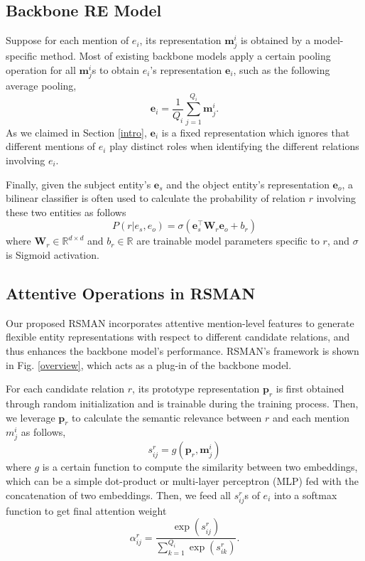 \documentclass[11pt]{article}
\begin{document}
\subsection{Backbone RE Model}




Suppose for each mention of $e_i$, its representation $\boldsymbol{m}^i_j$ is obtained by a model-specific method. Most of existing backbone models apply a certain pooling operation for all $\boldsymbol{m}^i_j$s to obtain $e_i$'s representation $\boldsymbol{e}_i$, such as the following average pooling,
\begin{equation}\label{en_co}
\boldsymbol{e}_i=\frac{1}{Q_i}\sum_{j=1}^{Q_i}\boldsymbol{m}_j^i.
\end{equation}
As we claimed in Section \ref{intro}, $\boldsymbol{e}_i$ is a fixed representation which ignores that different mentions of $e_i$ play distinct roles when identifying the different relations involving $e_i$. 

Finally, given the subject entity's $\boldsymbol{e}_{s}$ and the object entity's representation $\boldsymbol{e}_{o}$, a bilinear classifier is often used to calculate the probability of relation $r$ involving these two entities as follows
\begin{equation}\label{bilinear}
P(r|{e}_{s},{e}_{o}) = \sigma(\boldsymbol{e}_{s}^\top \boldsymbol{W}_r \boldsymbol{e}_{o}+b_r)
\end{equation}
where $\boldsymbol{W}_r \in \mathbb{R}^{d \times d}$ and $b_r \in \mathbb{R}$ are trainable model parameters specific to $r$, and $\sigma$ is Sigmoid activation. 


\subsection{Attentive Operations in RSMAN}
Our proposed RSMAN incorporates attentive mention-level features to generate flexible entity representations with respect to different candidate relations, and thus enhances the backbone model's performance. RSMAN's framework is shown in Fig. \ref{overview}, which acts as a plug-in of the backbone model. 

For each candidate relation $r$, its prototype representation $\boldsymbol{p}_r$ is first obtained through random initialization and is trainable during the training process. Then, we leverage $\boldsymbol{p}_r$ to calculate the semantic relevance between $r$ and each mention $m^i_j$ as follows,
\begin{equation}
{s}^{r}_{ij} = g(\boldsymbol{p}_r,\boldsymbol{m}^i_j)
\end{equation}
where $g$ is a certain function to compute the similarity between two embeddings, which can be a simple dot-product or multi-layer perceptron (MLP) fed with the concatenation of two embeddings. Then, we feed all $s^{r}_{ij}$s of $e_i$ into a softmax function to get final attention weight
\begin{equation}
   {\alpha}^{r}_{ij} = \frac{\exp(s^{r}_{ij})}{{\sum^{Q_i}_{k=1}}\exp({s^{r}_{ik}})}.
\end{equation}
\end{document}
